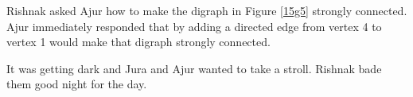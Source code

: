 Rishnak asked Ajur how to make the digraph in Figure \ref{15g5} strongly connected. Ajur immediately responded that by adding a directed edge from vertex 4 to vertex 1 would make that digraph strongly connected.

It was getting dark and Jura and Ajur wanted to take a stroll. Rishnak bade them good night for the day.

